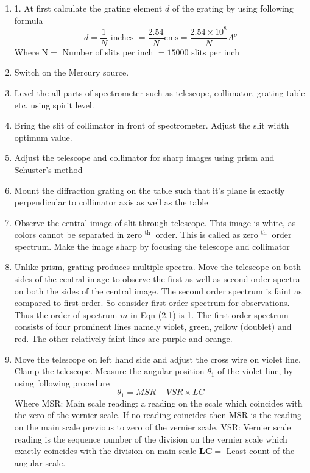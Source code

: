 \documentclass[11pt]{article}
\begin{document}
	\begin{enumerate}
		\item 	1. At first calculate the grating element $d$ of the grating by using following formula
		$$
		d=\frac{1}{N} \text { inches }=\frac{2.54}{N} \mathrm{cms}=\frac{2.54 \times 10^{8}}{N} A^{o}
		$$
		Where $\mathrm{N}=$ Number of slits per inch $=15000$ slits per inch
	
		\item Switch on the Mercury source.
	
	\item Level the all parts of spectrometer such as telescope, collimator, grating table etc. using spirit level.
	\item Bring the slit of collimator in front of spectrometer. Adjust the slit width optimum value.
	\item Adjust the telescope and collimator for sharp images using prism and Schuster's method
	\item Mount the diffraction grating on the table such that it's plane is exactly perpendicular to collimator axis as well as the table
	\item Observe the central image of slit through telescope. This image is white, as colors cannot be separated in zero ${ }^{\text {th }}$ order. This is called as zero ${ }^{\text {th }}$ order spectrum. Make the image sharp by focusing the telescope and collimator
	\item Unlike prism, grating produces multiple spectra. Move the telescope on both sides of the central image to observe the first as well as second order spectra on both the sides of the central image. The second order spectrum is faint as compared to first order. So consider first order spectrum for observations. Thus the order of spectrum $m$ in Eqn (2.1) is 1. The first order spectrum consists of four prominent lines namely violet, green, yellow (doublet) and red. The other relatively faint lines are purple and orange.
	\item Move the telescope on left hand side and adjust the cross wire on violet line. Clamp the telescope. Measure the angular position $\theta_{1}$ of the violet line, by using following procedure
$$
\theta_{1}=M S R+V S R \times L C
$$
Where MSR: Main scale reading: a reading on the scale which coincides with the zero of the vernier scale. If no reading coincides then MSR is the reading on the main scale previous to zero of the vernier scale.
VSR: Vernier scale reading is the sequence number of the division on the vernier scale which exactly coincides with the division on main scale $\mathbf{L C}=$ Least count of the angular scale.




\end{enumerate}
\end{document}
